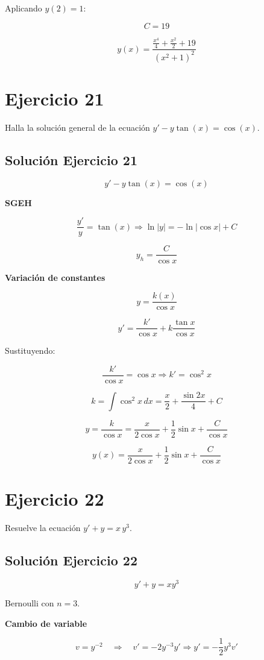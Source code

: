 \documentclass[12pt]{article}
\begin{document}
Aplicando \(y(2)=1\):

\[
C = 19
\]

\[
\boxed{
y(x) =
\dfrac{\frac{x^4}{4}+\frac{x^2}{2}+19}{(x^2+1)^2}
}
\]

\section*{Ejercicio 21}
Halla la solución general de la ecuación $y' - y \tan(x) = \cos(x)$.

\subsection*{Solución Ejercicio 21}

\[
y' - y\tan(x) = \cos(x)
\]

\textbf{SGEH}

\[
\frac{y'}{y} = \tan(x)
\Rightarrow
\ln|y| = -\ln|\cos x| + C
\]

\[
y_h = \frac{C}{\cos x}
\]

\textbf{Variación de constantes}

\[
y = \frac{k(x)}{\cos x}
\]

\[
y' = \frac{k'}{\cos x} + k\frac{\tan x}{\cos x}
\]

Sustituyendo:

\[
\frac{k'}{\cos x} = \cos x
\Rightarrow
k' = \cos^2 x
\]

\[
k = \int \cos^2 x\,dx
= \frac{x}{2} + \frac{\sin 2x}{4} + C
\]

\[
y = \frac{k}{\cos x}
= \frac{x}{2\cos x} + \frac{1}{2}\sin x + \frac{C}{\cos x}
\]

\[
\boxed{
y(x) =
\frac{x}{2\cos x}
+ \frac{1}{2}\sin x
+ \frac{C}{\cos x}
}
\]

\section*{Ejercicio 22}
Resuelve la ecuación $y' + y = x\,y^3$.

\subsection*{Solución Ejercicio 22}

\[
y' + y = xy^3
\]

Bernoulli con \(n=3\).

\textbf{Cambio de variable}

\[
v = y^{-2}
\quad\Rightarrow\quad
v' = -2y^{-3}y'
\Rightarrow
y' = -\frac{1}{2}y^3 v'
\]
\end{document}

